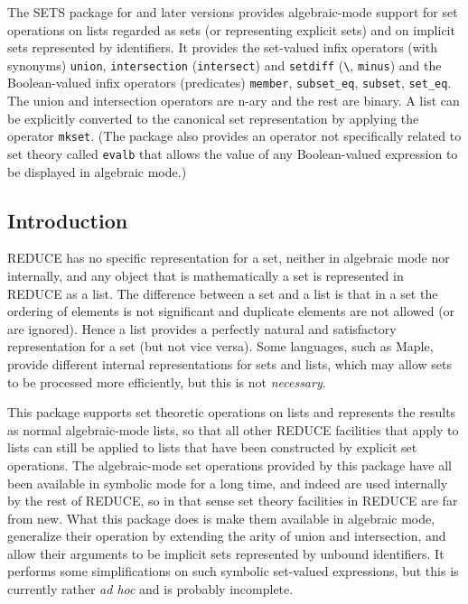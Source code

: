 

  The SETS package for  and later versions provides
  algebraic-mode support for set operations on lists regarded as sets
  (or representing explicit sets) and on implicit sets represented by
  identifiers.  It provides the set-valued infix operators (with
  synonyms) \texttt{union}, \texttt{intersection} (\texttt{intersect}) and
  \texttt{setdiff} (\texttt{\textbackslash}, \texttt{minus}) and the Boolean-valued infix
  operators (predicates) \texttt{member}, \texttt{subset\_eq}, \texttt{subset},
  \texttt{set\_eq}.  The union and intersection operators are n-ary and
  the rest are binary.  A list can be explicitly converted to the
  canonical set representation by applying the operator \texttt{mkset}.
  (The package also provides an operator not specifically related to
  set theory called \texttt{evalb} that allows the value of any
  Boolean-valued expression to be displayed in algebraic mode.)


\subsection{Introduction}

REDUCE has no specific representation for a set, neither in algebraic
mode nor internally, and any object that is mathematically a set is
represented in REDUCE as a list.  The difference between a set and a
list is that in a set the ordering of elements is not significant and
duplicate elements are not allowed (or are ignored).  Hence a list
provides a perfectly natural and satisfactory representation for a set
(but not vice versa).  Some languages, such as Maple, provide
different internal representations for sets and lists, which may allow
sets to be processed more efficiently, but this is not \emph{necessary}.

This package supports set theoretic operations on lists and represents
the results as normal algebraic-mode lists, so that all other REDUCE
facilities that apply to lists can still be applied to lists that have
been constructed by explicit set operations.  The algebraic-mode set
operations provided by this package have all been available in
symbolic mode for a long time, and indeed are used internally by the
rest of REDUCE, so in that sense set theory facilities in REDUCE are
far from new.  What this package does is make them available in
algebraic mode, generalize their operation by extending the arity of
union and intersection, and allow their arguments to be implicit sets
represented by unbound identifiers.  It performs some simplifications
on such symbolic set-valued expressions, but this is currently rather
{\it ad hoc\/} and is probably incomplete.

